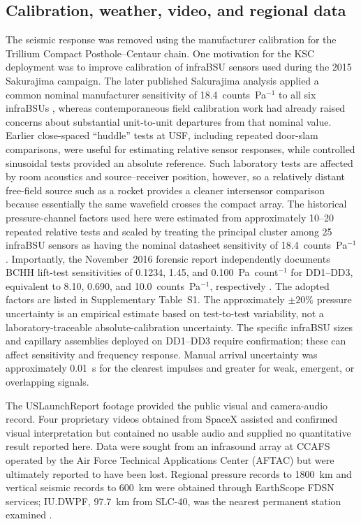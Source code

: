 \documentclass[]{seismica}
\begin{document}
\subsection{Calibration, weather, video, and regional data}

The seismic response was removed using the manufacturer calibration for the
Trillium Compact Posthole--Centaur chain. One motivation for the KSC
deployment was to improve calibration of infraBSU sensors used during the
2015 Sakurajima campaign. The later published Sakurajima analysis applied a
common nominal manufacturer sensitivity of 18.4~counts~Pa$^{-1}$ to all six
infraBSUs \citep{smith_sakurajima_2020}, whereas contemporaneous field
calibration work had already raised concerns about substantial unit-to-unit
departures from that nominal value. Earlier close-spaced ``huddle'' tests at
USF, including repeated door-slam comparisons, were useful for estimating
relative sensor responses, while controlled sinusoidal tests provided an
absolute reference. Such laboratory tests are affected by room acoustics and
source--receiver position, however, so a relatively distant free-field source
such as a rocket provides a cleaner intersensor comparison because essentially
the same wavefield crosses the compact array. The historical pressure-channel
factors used here were estimated from approximately 10--20 repeated relative
tests and scaled by treating the principal cluster among 25 infraBSU sensors
as having the nominal datasheet sensitivity of 18.4~counts~Pa$^{-1}$.
Importantly, the November~2016 forensic report independently documents BCHH
lift-test sensitivities of 0.1234, 1.45, and 0.100~Pa~count$^{-1}$ for
DD1--DD3, equivalent to 8.10, 0.690, and 10.0~counts~Pa$^{-1}$,
respectively \citep{thompson_mcnutt_fireball_2016}. The adopted factors are listed in
Supplementary Table~S1. The approximately $\pm20\%$ pressure
uncertainty is an empirical estimate based on test-to-test variability, not a
laboratory-traceable absolute-calibration uncertainty. The specific infraBSU
sizes and capillary assemblies deployed on DD1--DD3 require confirmation;
these can affect sensitivity and frequency response. Manual arrival uncertainty
was approximately 0.01~s for the clearest impulses and greater for weak,
emergent, or overlapping signals.

The USLaunchReport footage provided the public visual and camera-audio record.
Four proprietary videos obtained from SpaceX assisted and confirmed visual
interpretation but contained no usable audio and supplied no quantitative
result reported here. Data were sought from an infrasound array at CCAFS
operated by the Air Force Technical Applications Center (AFTAC)
but were ultimately reported to have been lost. Regional pressure records to 1800~km
and vertical seismic records to 600~km were obtained through EarthScope FDSN
services; IU.DWPF, 97.7~km from SLC-40, was the nearest permanent station
examined \citep{asl_gsn_iu_1988}.
\end{document}
